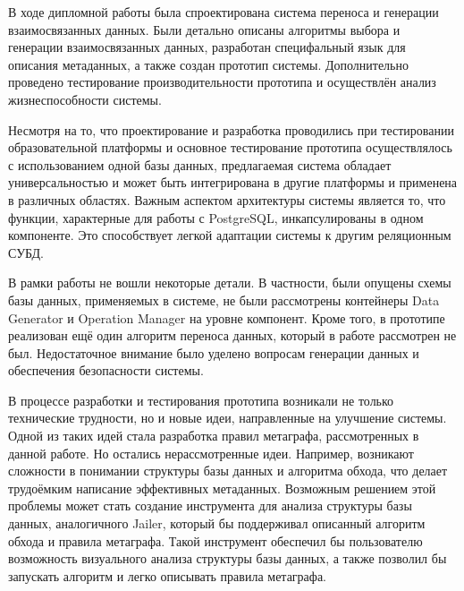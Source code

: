 \conclusion

В ходе дипломной работы была спроектирована система переноса и генерации взаимосвязанных данных. Были детально описаны алгоритмы выбора и генерации взаимосвязанных данных, разработан специфальный язык для описания метаданных, а также создан прототип системы. Дополнительно проведено тестирование производительности прототипа и осуществлён анализ жизнеспособности системы.

Несмотря на то, что проектирование и разработка проводились при тестировании образовательной платформы и основное тестирование прототипа осуществлялось с использованием одной базы данных, предлагаемая система обладает универсальностью и может быть интегрирована в другие платформы и применена в различных областях. Важным аспектом архитектуры системы является то, что функции, характерные для работы с PostgreSQL, инкапсулированы в одном компоненте. Это способствует легкой адаптации системы к другим реляционным СУБД.

В рамки работы не вошли некоторые детали. В частности, были опущены схемы базы данных, применяемых в системе, не были рассмотрены контейнеры Data Generator и Operation Manager на уровне компонент. Кроме того, в прототипе реализован ещё один алгоритм переноса данных, который в работе рассмотрен не был. Недостаточное внимание было уделено вопросам генерации данных и обеспечения безопасности системы.

В процессе разработки и тестирования прототипа возникали не только технические трудности, но и новые идеи, направленные на улучшение системы. Одной из таких идей стала разработка правил метаграфа, рассмотренных в данной работе. Но остались нерассмотренные идеи. Например, возникают сложности в понимании структуры базы данных и алгоритма обхода, что делает трудоёмким написание эффективных метаданных. Возможным решением этой проблемы может стать создание инструмента для анализа структуры базы данных, аналогичного Jailer, который бы поддерживал описанный алгоритм обхода и правила метаграфа. Такой инструмент обеспечил бы пользователю возможность визуального анализа структуры базы данных, а также позволил бы запускать алгоритм и легко описывать правила метаграфа.
